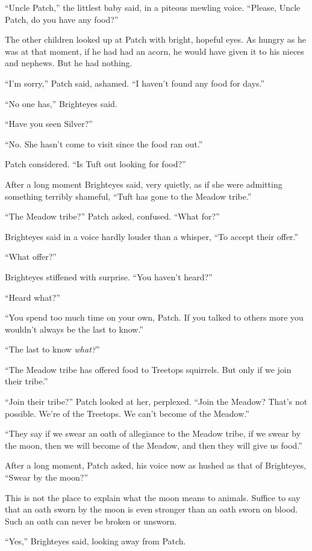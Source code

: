 \documentclass[ebook,oneside,openany,12pt]{memoir}
\begin{document}
“Uncle Patch,” the littlest baby said, in a piteous mewling
voice. “Please, Uncle Patch, do you have any food?”

The other children looked up at Patch with bright, hopeful eyes. As
hungry as he was at that moment, if he had had an acorn, he would have
given it to his nieces and nephews. But he had nothing.

“I’m sorry,” Patch said, ashamed. “I haven’t found any food for days.”

“No one has,” Brighteyes said.

“Have you seen Silver?”

“No. She hasn’t come to visit since the food ran out.”

Patch considered. “Is Tuft out looking for food?”

After a long moment Brighteyes said, very quietly, as if she were
admitting something terribly shameful, “Tuft has gone to the Meadow
tribe.”

“The Meadow tribe?” Patch asked, confused. “What for?”

Brighteyes said in a voice hardly louder than a whisper, “To accept
their offer.”

“What offer?”

Brighteyes stiffened with surprise. “You haven’t heard?”

“Heard what?”

“You spend too much time on your own, Patch. If you talked to others
more you wouldn’t always be the last to know.”

“The last to know \emph{what?}”

“The Meadow tribe has offered food to Treetops squirrels. But only if
we join their tribe.”

“Join their tribe?” Patch looked at her, perplexed. “Join the Meadow?
That’s not possible. We’re of the Treetops. We can’t become of the
Meadow.”

“They say if we swear an oath of allegiance to the Meadow tribe, if we
swear by the moon, then we will become of the Meadow, and then they
will give us food.”

After a long moment, Patch asked, his voice now as hushed as that of
Brighteyes, “Swear by the moon?”

This is not the place to explain what the moon means to
animals. Suffice to say that an oath sworn by the moon is even
stronger than an oath sworn on blood. Such an oath can never be broken
or unsworn.

“Yes,” Brighteyes said, looking away from Patch.
\end{document}
